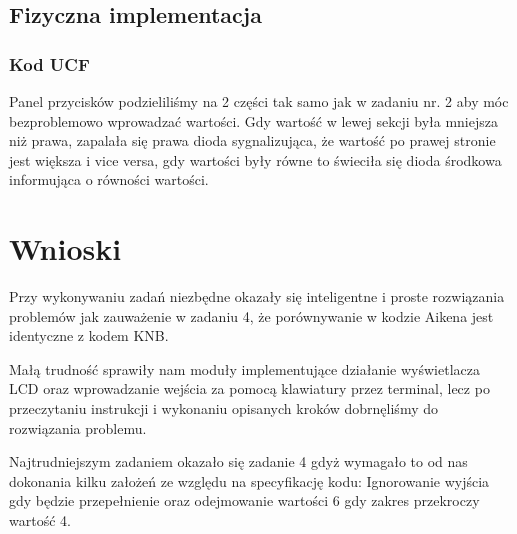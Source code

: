 \documentclass[a4paper,12pt]{extarticle}  %
\begin{document}
\subsection{Fizyczna implementacja}
\subsubsection{Kod UCF}


Panel przycisków podzieliliśmy na 2 części tak samo jak w zadaniu nr. 2 aby móc bezproblemowo wprowadzać wartości.
Gdy wartość w lewej sekcji była mniejsza niż prawa, zapalała się prawa dioda sygnalizująca, że wartość po prawej stronie jest większa i vice versa, gdy wartości były równe to świeciła się dioda środkowa informująca o równości wartości.
\section{Wnioski}
Przy wykonywaniu zadań niezbędne okazały się inteligentne i proste rozwiązania problemów jak zauważenie w zadaniu 4, że porównywanie w kodzie Aikena jest identyczne z kodem KNB.

Małą trudność sprawiły nam moduły implementujące działanie wyświetlacza LCD oraz wprowadzanie wejścia za pomocą klawiatury przez terminal, lecz po przeczytaniu instrukcji i wykonaniu opisanych kroków dobrnęliśmy do rozwiązania problemu.

Najtrudniejszym zadaniem okazało się zadanie 4 gdyż wymagało to od nas dokonania kilku założeń ze względu na specyfikację kodu:
Ignorowanie wyjścia gdy będzie przepełnienie oraz odejmowanie wartości 6 gdy zakres przekroczy wartość 4.
\end{document}
